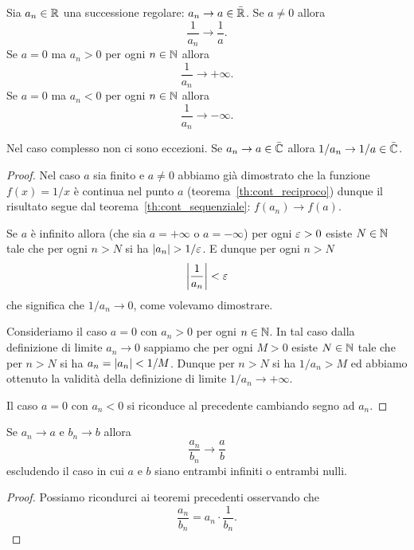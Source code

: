 \begin{theorem}
\label{th:limite_reciproco}
\mymark{**}
Sia $a_n\in \mathbb R$ una successione regolare: $a_n \to a\in \bar {\mathbb R}$.
Se $a\neq 0$ allora
\[
  \frac{1}{a_n} \to \frac{1}{a}.
\]
Se $a = 0$ ma $a_n>0$ per ogni $n\in \mathbb N$ allora
\[
  \frac{1}{a_n} \to +\infty.
\]
Se $a=0$ ma $a_n<0$ per ogni $n\in \mathbb N$ allora
\[
  \frac{1}{a_n} \to -\infty.
\]

Nel caso complesso non ci sono eccezioni.
Se $a_n\to a \in \bar {\mathbb C}$ allora $1/a_n \to 1/a\in \bar {\mathbb C}$.
\end{theorem}
%
\begin{proof}
\mymark{*}
Nel caso $a$ sia finito e $a\neq 0$ abbiamo già dimostrato
che la funzione $f(x)=1/x$ è continua nel punto $a$
(teorema~\ref{th:cont_reciproco}) dunque
il risultato segue dal
teorema~\ref{th:cont_sequenziale}: $f(a_n)\to f(a)$.

Se $a$ è infinito allora
(che sia $a=+\infty$ o $a=-\infty$)
per ogni $\varepsilon > 0$ esiste $N\in \mathbb N$ tale che per ogni $n>N$ si ha
${\left|a_n\right|} > 1/\varepsilon$. E dunque per ogni $n>N$
\[
{\left|\frac{1}{a_n}\right|} < \varepsilon
\]
che significa che $1/a_n \to 0$, come volevamo dimostrare.

Consideriamo il caso $a=0$ con $a_n>0$ per ogni $n\in \mathbb N$. In tal caso
dalla definizione di limite $a_n \to 0$ sappiamo che
per ogni $M>0$ esiste $N\in \mathbb N$ tale che per $n>N$ si ha
$a_n = {\left|a_n\right|} < 1/M$. Dunque per $n>N$ si ha $1/a_n > M$ ed
abbiamo ottenuto la validità della definizione di limite $1/a_n \to +\infty$.

Il caso $a=0$ con $a_n<0$ si riconduce al precedente cambiando
segno ad $a_n$.
\end{proof}

\begin{theorem}
\label{th:limite_rapporto}
\mymark{**}
Se $a_n \to a$ e $b_n\to b$ allora
\[
  \frac{a_n}{b_n} \to \frac{a}{b}
\]
escludendo il caso in cui $a$ e $b$ siano entrambi infiniti o entrambi nulli.
\end{theorem}
%
\begin{proof}
\mymark{*}
Possiamo ricondurci ai teoremi precedenti osservando che
\[
   \frac{a_n}{b_n} = a_n \cdot \frac{1}{b_n}.
\]
\end{proof}

